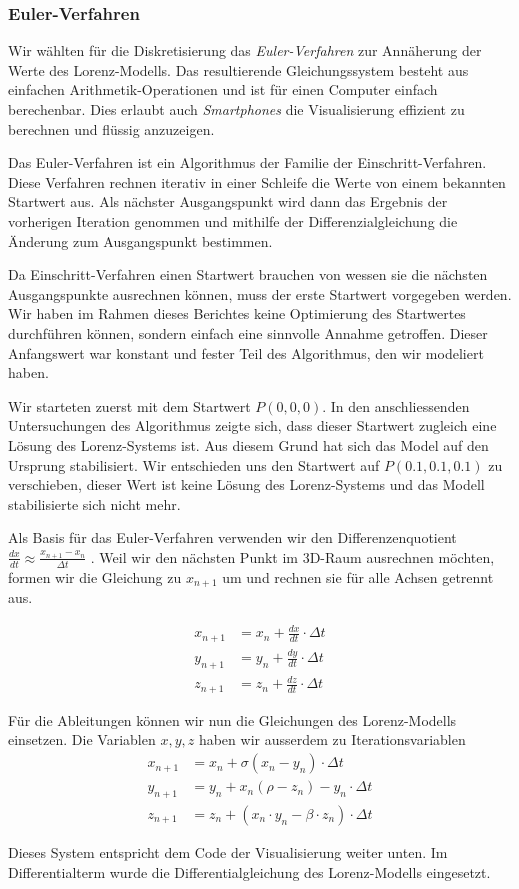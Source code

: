 \subsubsection{Euler-Verfahren} \label{euler-verfahren}

Wir wählten für die Diskretisierung das \textit{Euler-Verfahren} zur Annäherung der Werte des Lorenz-Modells. Das resultierende Gleichungssystem besteht aus einfachen Arithmetik-Operationen und ist für einen Computer einfach berechenbar. Dies erlaubt auch \textit{Smartphones} die Visualisierung effizient zu berechnen und flüssig anzuzeigen.

Das Euler-Verfahren ist ein Algorithmus der Familie der Einschritt-Verfahren. Diese Verfahren rechnen iterativ in einer Schleife die Werte von einem bekannten Startwert aus. Als nächster Ausgangspunkt wird dann das Ergebnis der vorherigen Iteration genommen und mithilfe der Differenzialgleichung die Änderung zum Ausgangspunkt bestimmen. 

Da Einschritt-Verfahren einen Startwert brauchen von wessen sie die nächsten Ausgangspunkte ausrechnen können, muss der erste Startwert vorgegeben werden. Wir haben im Rahmen dieses Berichtes keine Optimierung des Startwertes durchführen können, sondern einfach eine sinnvolle Annahme getroffen. Dieser Anfangswert war konstant und fester Teil des Algorithmus, den wir modeliert haben.

Wir starteten zuerst mit dem Startwert $ P(0, 0, 0) $. In den anschliessenden Untersuchungen des Algorithmus zeigte sich, dass dieser Startwert zugleich eine Lösung des Lorenz-Systems ist. Aus diesem Grund hat sich das Model auf den Ursprung stabilisiert. Wir entschieden uns den Startwert auf $ P(0.1, 0.1, 0.1) $ zu verschieben, dieser Wert ist keine Lösung des Lorenz-Systems und das Modell stabilisierte sich nicht mehr.

Als Basis für das Euler-Verfahren verwenden wir den Differenzenquotient $ \frac{dx}{dt} \approx \frac{x_{n + 1} - x_n}{\Delta t} $ \cite{dahmen2008}.  Weil wir den nächsten Punkt im 3D-Raum ausrechnen möchten, formen wir die Gleichung zu $ x_{n + 1} $  um und rechnen sie für alle Achsen getrennt aus.

\begin{align}
    x_{n + 1} &= x_n + \frac{dx}{dt} \cdot \Delta t\\
    y_{n + 1} &= y_n + \frac{dy}{dt} \cdot \Delta t\\
    z_{n + 1} &= z_n + \frac{dz}{dt} \cdot \Delta t
\end{align}

Für die Ableitungen können wir nun die Gleichungen des Lorenz-Modells einsetzen. Die Variablen $ x, y, z $ haben wir ausserdem zu Iterationsvariablen 
\begin{align}
    x_{n + 1} &= x_n + \sigma(x_n - y_n) \cdot \Delta t\\
    y_{n + 1} &= y_n + x_n(\rho - z_n) - y_n \cdot \Delta t\\
    z_{n + 1} &= z_n + (x_n \cdot y_n - \beta \cdot z_n) \cdot \Delta t
\end{align}

Dieses System entspricht dem Code der Visualisierung weiter unten. Im Differentialterm wurde die Differentialgleichung des Lorenz-Modells eingesetzt.
